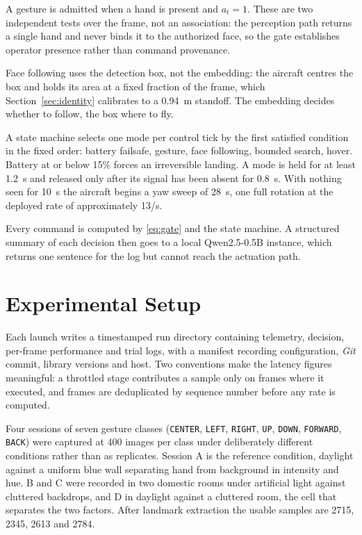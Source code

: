 \documentclass[conference]{IEEEtran}
\begin{document}
A gesture is admitted when a hand is present and $a_t=1$.
These are two independent tests over the frame, not an association: the
perception path returns a single hand and never binds it to the authorized face,
so the gate establishes operator presence rather than command provenance.

Face following uses the detection box, not the embedding: the aircraft centres
the box and holds its area at a fixed fraction of the frame, which
Section~\ref{sec:identity} calibrates to a 0.94~m standoff. The embedding
decides whether to follow, the box where to fly.

A state machine selects one mode per control tick by the first satisfied
condition in the fixed order: battery failsafe, gesture, face following, bounded search, hover.
Battery at or below 15\% forces an irreversible landing.
A mode is held for at least 1.2~s and released only after its signal has been
absent for 0.8~s.
With nothing seen for 10~s the aircraft begins a yaw sweep of 28~s, one full
rotation at the deployed rate of approximately 13\textdegree/s.

Every command is computed by \eqref{eq:gate} and the state machine.
A structured summary of each decision then goes to a local Qwen2.5-0.5B
instance, which returns one sentence for the log but cannot reach the actuation path.

\section{Experimental Setup}
\label{sec:setup}

Each launch writes a timestamped run directory containing telemetry, decision,
per-frame performance and trial logs, with a manifest recording configuration,
\textit{Git} commit, library versions and host.
Two conventions make the latency figures meaningful: a throttled stage
contributes a sample only on frames where it executed, and frames are
deduplicated by sequence number before any rate is computed.

Four sessions of seven gesture classes (\texttt{CENTER}, \texttt{LEFT}, \texttt{RIGHT}, \texttt{UP}, \texttt{DOWN}, \texttt{FORWARD},
\texttt{BACK}) were captured at 400 images per class under deliberately different
conditions rather than as replicates.
Session A is the reference condition, daylight against a uniform blue wall
separating hand from background in intensity and hue.
B and C were recorded 
in two domestic rooms under artificial
light against cluttered backdrops, and D in daylight against a cluttered room,
the cell that separates the two factors.
After landmark extraction the usable samples are 2715, 2345, 2613 and 2784.
\end{document}
